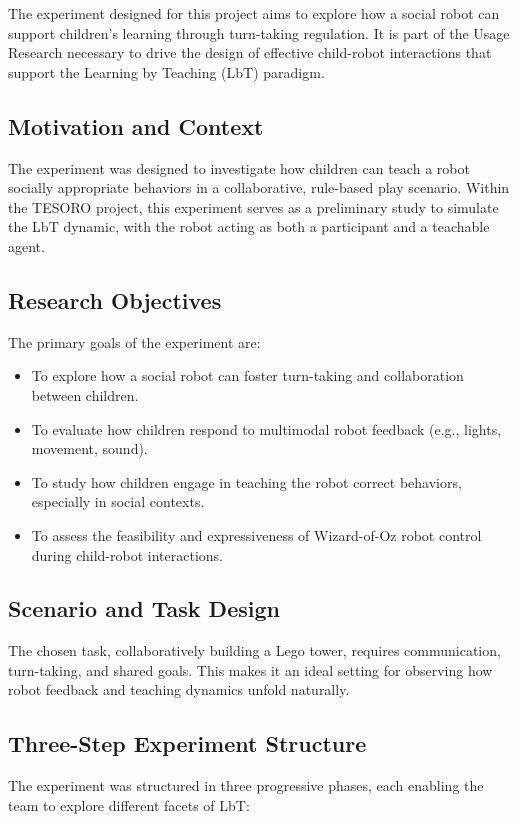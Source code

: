 \documentclass[a4paper]{usiinfbachelorproject}
\begin{document}
The experiment designed for this project aims to explore how a social robot can support children's learning through turn-taking regulation.
It is part of the Usage Research necessary to drive the design of effective child-robot interactions that support the Learning by Teaching (LbT) paradigm.

\subsection*{\textbf{Motivation and Context}}
The experiment was designed to investigate how children can teach a robot socially appropriate behaviors in a collaborative, rule-based play scenario.
Within the TESORO project, this experiment serves as a preliminary study to simulate the LbT dynamic, with the robot acting as both a participant and a teachable agent.

\subsection*{\textbf{Research Objectives}}
The primary goals of the experiment are:
\begin{itemize}
    \item To explore how a social robot can foster turn-taking and collaboration between children.
    \item To evaluate how children respond to multimodal robot feedback (e.g., lights, movement, sound).
    \item To study how children engage in teaching the robot correct behaviors, especially in social contexts.
    \item To assess the feasibility and expressiveness of Wizard-of-Oz robot control during child-robot interactions.
\end{itemize}

\subsection*{\textbf{Scenario and Task Design}}
The chosen task, collaboratively building a Lego tower, requires communication, turn-taking, and shared goals.
This makes it an ideal setting for observing how robot feedback and teaching dynamics unfold naturally.

\subsection*{\textbf{Three-Step Experiment Structure}}
The experiment was structured in three progressive phases, each enabling the team to explore different facets of LbT:
\end{document}
